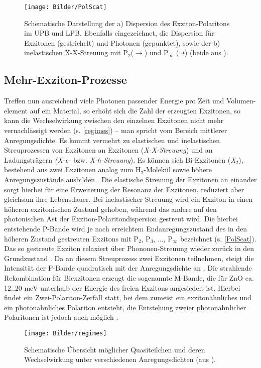 \begin{figure}[htb]
\centering
\texttt{[image: Bilder/PolScat]}
\caption[Polaritonendispersion und inelastische X-X-Streuung]{Schematische Darstellung der a) Dispersion des Exziton-Polaritons im UPB und LPB. Ebenfalls eingezeichnet, die Dispersion für Exzitonen (gestrichelt) und Photonen (gepunktet), sowie der b) inelastischen X-X-Streuung mit P$_\text{2}$($\longrightarrow$) und P$_\infty$ ($\dashrightarrow$) (beide aus \cite{Richters.Diss}).}
\label{PolScat}
\end{figure}
\subsection{Mehr-Exziton-Prozesse}
Treffen nun ausreichend viele Photonen passender Energie pro Zeit und Volumen- element auf ein Material, so erhöht sich die Zahl der erzeugten Exzitonen, so kann die Wechselwirkung zwischen den einzelnen Exzitonen nicht mehr vernachlässigt \mbox{werden} (s. \autoref{regimes}) – man spricht vom Bereich mittlerer Anregungsdichte. Es kommt \mbox{vermehrt} zu elastischen und inelastischen Streuprozessen von Exzitonen an \mbox{Exzitonen} (\textit{X-X-Streuung}) und an Ladungsträgern \textit{(X-e-} bzw. \textit{X-h-Streuung}). Es können sich Bi-Exzitonen (\textit{X$_\text{2}$}), bestehend aus zwei Exzitonen analog zum H$_\text{2}$-Molekül sowie höhere Anregungszustände ausbilden \cite{Corfdir.2011}. Die elastische Streuung der Exzitonen an einander sorgt hierbei für eine Erweiterung der Resonanz der Exzitonen, reduziert aber \mbox{gleichsam} ihre Lebensdauer. Bei inelastischer Streuung wird ein Exziton in einen \mbox{höheren} exzitonischen Zustand gehoben, während das andere auf den photonischen Ast der Exziton-Polaritondispersion gestreut wird. Die hierbei entstehende P-Bande wird je nach erreichtem Endanregungszustand des in den höheren Zustand gestreuten Exzitons mit P$_\text{2}$, P$_\text{3}$, ..., P$_\infty$ bezeichnet (s. \autoref{PolScat}). Das so gestreute Exziton relaxiert über Phononen-Streuung wieder zurück in den Grundzustand \cite{Klingshirn.1975}.
Da an diesem Streuprozess zwei Exzitonen teilnehmen, steigt die Intensität der P-Bande quadratisch mit der Anregungsdichte an \cite{Priller.2004}. Die strahlende Rekombination für Biexzitonen erzeugt die sogenannte M-Bande, die für ZnO ca. 12..20 meV unterhalb der Energie des freien Exzitons angesiedelt ist. Hierbei findet ein Zwei-Polariton-Zerfall statt, bei dem zumeist ein exzitonähnliches und ein photonähnliches Polariton entsteht, die Entstehung zweier photonähnlicher Polaritonen ist jedoch auch möglich \cite{Hvam.1983}. 
\begin{figure}[htb]
\centering
\texttt{[image: Bilder/regimes]}
\caption[Übersicht Exzitonen unter hohen Anregungsdichten]{Schematische Übersicht möglicher Quasiteilchen und deren Wechselwirkung unter verschiedenen Anregungsdichten (aus \cite{Richters.Diss}).}
\label{regimes}
\end{figure}

